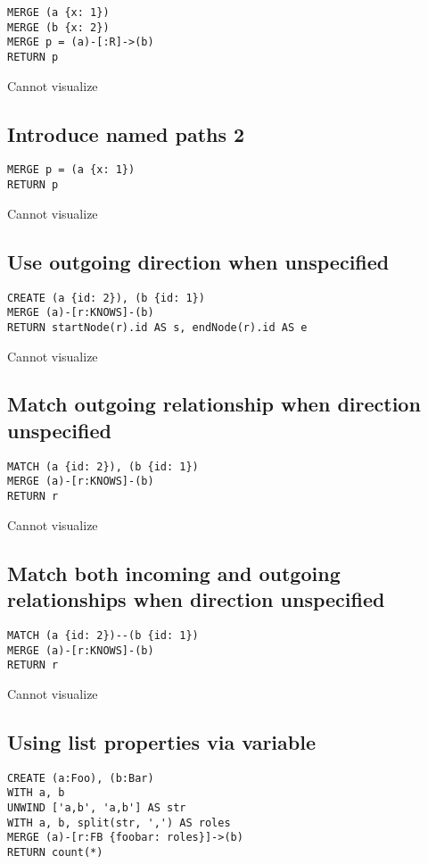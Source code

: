 \begin{lstlisting}
MERGE (a {x: 1})
MERGE (b {x: 2})
MERGE p = (a)-[:R]->(b)
RETURN p
\end{lstlisting}

Cannot visualize
\subsection{Introduce named paths 2}

\begin{lstlisting}
MERGE p = (a {x: 1})
RETURN p
\end{lstlisting}

Cannot visualize
\subsection{Use outgoing direction when unspecified}

\begin{lstlisting}
CREATE (a {id: 2}), (b {id: 1})
MERGE (a)-[r:KNOWS]-(b)
RETURN startNode(r).id AS s, endNode(r).id AS e
\end{lstlisting}

Cannot visualize
\subsection{Match outgoing relationship when direction unspecified}

\begin{lstlisting}
MATCH (a {id: 2}), (b {id: 1})
MERGE (a)-[r:KNOWS]-(b)
RETURN r
\end{lstlisting}

Cannot visualize
\subsection{Match both incoming and outgoing relationships when direction unspecified}

\begin{lstlisting}
MATCH (a {id: 2})--(b {id: 1})
MERGE (a)-[r:KNOWS]-(b)
RETURN r
\end{lstlisting}

Cannot visualize
\subsection{Using list properties via variable}

\begin{lstlisting}
CREATE (a:Foo), (b:Bar)
WITH a, b
UNWIND ['a,b', 'a,b'] AS str
WITH a, b, split(str, ',') AS roles
MERGE (a)-[r:FB {foobar: roles}]->(b)
RETURN count(*)
\end{lstlisting}

